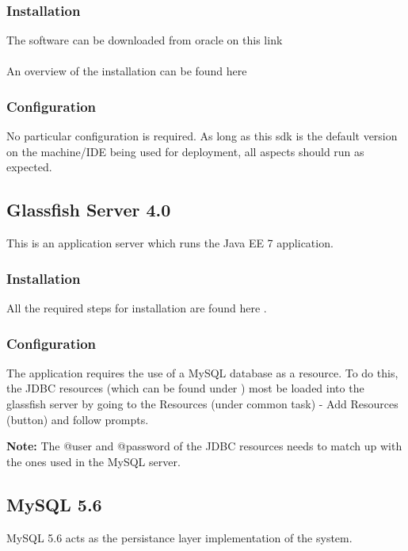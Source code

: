 \documentclass[12pt]{article}
\begin{document}
\subsubsection{Installation} 
The software can be downloaded from oracle on this link \textbf{}  \\
\\
An overview of the installation can be found here \textbf{} 
   
\subsubsection{Configuration}
No particular configuration is required. As long as this sdk is the default version on the machine/IDE being used for deployment, all aspects should run as expected.

\subsection{Glassfish Server 4.0}
This is an application server which runs the Java EE 7 application.

\subsubsection{Installation}
All the required steps for installation are found here \textbf{}.  

\subsubsection{Configuration}
The application requires the use of a MySQL database as a resource. To do this, the JDBC resources (which can be found under \textbf{}) most be loaded into the glassfish server by going to the Resources (under common task) - Add Resources (button)  and follow prompts. 

\textbf{Note:} The @user and @password of the JDBC resources needs to match up with the ones used in the MySQL server.  

\subsection{MySQL 5.6}
MySQL 5.6 acts as the persistance layer implementation of the system.
\end{document}
